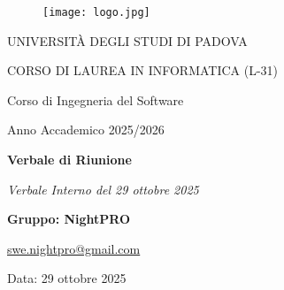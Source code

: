 \documentclass[a4paper, 11pt, oneside]{scrartcl} %
\begin{document}
\thispagestyle{empty}
\begin{titlepage}
    \centering
    
\begin{figure}
    \centering
    \texttt{[image: logo.jpg]}
\end{figure}

    \vfill
    
    {\small UNIVERSITÀ DEGLI STUDI DI PADOVA \par}
    {\small CORSO DI LAUREA IN INFORMATICA (L-31) \par}
    \vspace{0.5cm}
    {\large Corso di Ingegneria del Software \par}
    {\small Anno Accademico 2025/2026 \par}
    
    \vfill
    
    {\Huge \bfseries Verbale di Riunione \par}
    
    \vspace{1cm}
    
    {\Large \itshape Verbale Interno del 29 ottobre 2025 \par} 
    
    \vfill
    
    {\Large \bfseries Gruppo: NightPRO \par}
    \vspace{0.5cm}
    {\large \href{mailto:swe.nightpro@gmail.com}{swe.nightpro@gmail.com} \par}
    
    \vfill
  
    {\large Data: 29 ottobre 2025 \par}

\end{titlepage}

\newpage
\tableofcontents %
\pagestyle{fancy} %

\newpage
\end{document}
